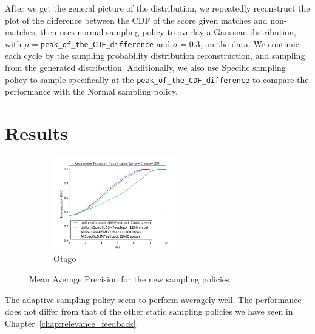 After we get the general picture of the distribution, we repeatedly reconstruct
the plot of the difference between the CDF of the score given matches and
non-matches, then uses normal sampling policy to overlay a Gaussian
distribution, with $\mu=$\texttt{peak\_of\_the\_CDF\_difference} and
$\sigma=0.3$, on the data. We continue each cycle by the sampling probability
distribution reconstruction, and sampling from the generated distribution.
Additionally, we also use Specific sampling policy to sample specifically at
the \texttt{peak\_of\_the\_CDF\_difference} to compare the performance with the
Normal sampling policy.

\section{Results}

\begin{figure}[htb]
  \centering
  \begin{subfigure}[t]{\textwidth}
    \centering
    \includegraphics[width=0.6\textwidth]{otago}
    \caption{Otago}
  \end{subfigure}
  \caption{Mean Average Precision for the new sampling policies}
  \label{fig:adaptive_aoc} %
\end{figure}

The adaptive sampling policy seem to perform averagely well. The performance
does not differ from that of the other static sampling policies we have seen in
Chapter~\ref{chap:relevance_feedback}.

